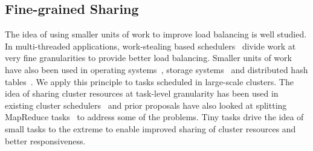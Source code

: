 \subsection{Fine-grained Sharing}
The idea of using smaller units of work to improve load balancing is well
studied.  In multi-threaded applications, work-stealing
based schedulers~\cite{blumofe1994scheduling} divide work at very fine granularities to provide better load
balancing.  Smaller units of work have also been used in
operating systems~\cite{sherman1972trace}, storage systems~\cite{ghemawat2003google,
chang2008bigtable} and distributed hash tables~\cite{stoica2001chord}. We apply this
principle to tasks scheduled in large-scale clusters.  The
idea of sharing cluster resources at task-level granularity has been used in
existing cluster schedulers~\cite{hindman2011mesos, zaharia2010delay} and prior
proposals have also looked at splitting MapReduce tasks~\cite{bhatotia2011incoop} to
address some of the problems.
Tiny tasks drive the idea of small tasks to the extreme to enable improved
sharing of cluster resources
and better responsiveness.


